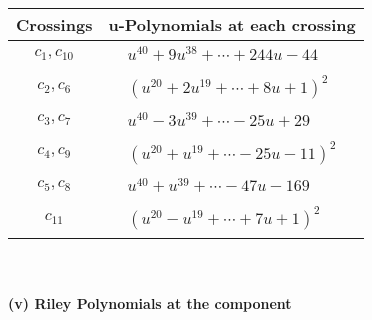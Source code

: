 \documentclass[1p]{elsarticle_modified}
\theoremstyle{definition}
\begin{document}
\begin{tabular}{m{50pt}|m{274pt}}
Crossings & \hspace{64pt}u-Polynomials at each crossing \\
\hline $$\begin{aligned}c_{1},c_{10}\end{aligned}$$&$\begin{aligned}
&u^{40}+9 u^{38}+\cdots+244 u-44
\end{aligned}$\\
\hline $$\begin{aligned}c_{2},c_{6}\end{aligned}$$&$\begin{aligned}
&(u^{20}+2 u^{19}+\cdots+8 u+1)^{2}
\end{aligned}$\\
\hline $$\begin{aligned}c_{3},c_{7}\end{aligned}$$&$\begin{aligned}
&u^{40}-3 u^{39}+\cdots-25 u+29
\end{aligned}$\\
\hline $$\begin{aligned}c_{4},c_{9}\end{aligned}$$&$\begin{aligned}
&(u^{20}+u^{19}+\cdots-25 u-11)^{2}
\end{aligned}$\\
\hline $$\begin{aligned}c_{5},c_{8}\end{aligned}$$&$\begin{aligned}
&u^{40}+u^{39}+\cdots-47 u-169
\end{aligned}$\\
\hline $$\begin{aligned}c_{11}\end{aligned}$$&$\begin{aligned}
&(u^{20}- u^{19}+\cdots+7 u+1)^{2}
\end{aligned}$\\
\hline
\end{tabular}\\~\\
\newpage\renewcommand{\arraystretch}{1}
\flushleft \textbf{(v) Riley Polynomials at the component}\newline \\
\end{document}

